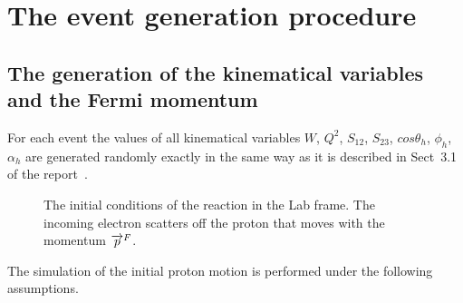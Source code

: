 

\newpage
\chapter{The event generation procedure}
\label{sect:proc}
\mbox{}\vspace{-\baselineskip}



\section {The generation of the kinematical variables and the Fermi momentum}
\label{sect:gen_var}

For each event the values of all kinematical variables $W$, $Q^2$, $S_{12}$, $S_{23}$, $cos \theta_{h}$, $\phi_{h}$, $\alpha_{h}$ are generated randomly exactly in the same way as it is described in Sect~3.1 of the report~\cite{twopeg}.

\begin{figure}[!ht]
\begin{center}
\end{center}
\caption{\small The initial conditions of the reaction in the Lab frame. The incoming electron scatters off the proton that moves with the momentum $\protect\overrightarrow{p}^{F}$. }
\label{fig:lab_fermi}
\end{figure}



The simulation of the initial proton motion is performed under the following assumptions. 

